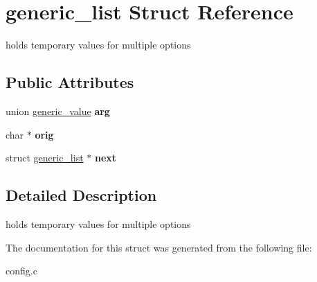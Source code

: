 \hypertarget{structgeneric__list}{}\section{generic\+\_\+list Struct Reference}
\label{structgeneric__list}


holds temporary values for multiple options  


\subsection*{Public Attributes}
\begin{DoxyCompactItemize}
\item 
\hypertarget{structgeneric__list_a1b4660ab18619e5bcd03b53f8a89c9a0}{}union \hyperlink{uniongeneric__value}{generic\+\_\+value} {\bfseries arg}\label{structgeneric__list_a1b4660ab18619e5bcd03b53f8a89c9a0}

\item 
\hypertarget{structgeneric__list_a34479dfdb2f02ee70f3f02847732ae29}{}char $\ast$ {\bfseries orig}\label{structgeneric__list_a34479dfdb2f02ee70f3f02847732ae29}

\item 
\hypertarget{structgeneric__list_a5d87e147f2cfe5e11a9737ecd3312109}{}struct \hyperlink{structgeneric__list}{generic\+\_\+list} $\ast$ {\bfseries next}\label{structgeneric__list_a5d87e147f2cfe5e11a9737ecd3312109}

\end{DoxyCompactItemize}


\subsection{Detailed Description}
holds temporary values for multiple options 

The documentation for this struct was generated from the following file\+:\begin{DoxyCompactItemize}
\item 
config.\+c\end{DoxyCompactItemize}
